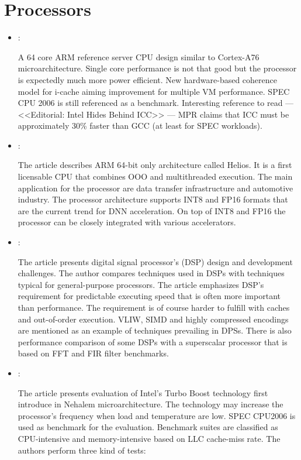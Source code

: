\section*{Processors}
\begin{itemize}
    \item \cite{Gwennap:ARM-Neoverse:2019}:

    A 64 core ARM reference server CPU design similar to Cortex-A76 microarchitecture. Single core performance is not that good but the processor is expectedly much more power efficient. New hardware-based coherence model for i-cache aiming improvement for multiple VM performance. SPEC CPU 2006 is still referenced as a benchmark. Interesting reference to read --- <<Editorial: Intel Hides Behind ICC>> --- MPR claims that ICC must be approximately 30\% faster than GCC (at least for SPEC workloads).

    \item \cite{Demler:Helios:2019}:

    The article describes ARM 64-bit only architecture called Helios. It is a first licensable CPU that combines OOO and multithreaded execution. The main application for the processor are data transfer infrastructure and automotive industry. The processor architecture supports INT8 and FP16 formats that are the current trend for DNN acceleration. On top of INT8 and FP16 the processor can be closely integrated with various accelerators.

    \item \cite{Eyre:DSP-Derby:2001}:

    The article presents digital signal processor's (DSP) design and development challenges. The author compares techniques used in DSPs with techniques typical for general-purpose processors. The article emphasizes DSP's requirement for predictable executing speed that is often more important than performance. The requirement is of course harder to fulfill with caches and out-of-order execution. VLIW, SIMD and highly compressed encodings are mentioned as an example of techniques prevailing in DPSs. There is also performance comparison of some DSPs with a superscalar processor that is based on FFT and FIR filter benchmarks.

    \item \cite{Charles:TruboBoostEvaluation:2009}:

    The article presents evaluation of Intel's Turbo Boost technology first introduce in Nehalem microarchitecture. The technology may increase the processor's frequency when load and temperature are low. SPEC CPU2006 is used as benchmark for the evaluation. Benchmark suites are classified as CPU-intensive and memory-intensive based on LLC cache-miss rate. The authors perform three kind of tests:


\end{itemize}
